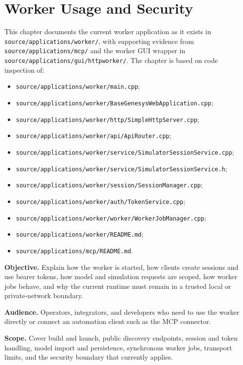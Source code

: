\chapter{Worker Usage and Security}
\label{chap:worker-usage-and-security}

This chapter documents the current worker application as it exists in
\texttt{source/applications/worker/}, with supporting evidence from
\texttt{source/applications/mcp/} and the worker GUI wrapper in
\texttt{source/applications/gui/httpworker/}. The chapter is based on code
inspection of:
\begin{itemize}
\item \texttt{source/applications/worker/main.cpp};
\item \texttt{source/applications/worker/BaseGenesysWebApplication.cpp};
\item \texttt{source/applications/worker/http/SimpleHttpServer.cpp};
\item \texttt{source/applications/worker/api/ApiRouter.cpp};
\item \texttt{source/applications/worker/service/SimulatorSessionService.cpp};
\item \texttt{source/applications/worker/service/SimulatorSessionService.h};
\item \texttt{source/applications/worker/session/SessionManager.cpp};
\item \texttt{source/applications/worker/auth/TokenService.cpp};
\item \texttt{source/applications/worker/worker/WorkerJobManager.cpp};
\item \texttt{source/applications/worker/README.md};
\item \texttt{source/applications/mcp/README.md}.
\end{itemize}

\noindent\textbf{Objective.} Explain how the worker is started, how clients
create sessions and use bearer tokens, how model and simulation requests are
scoped, how worker jobs behave, and why the current runtime must remain in a
trusted local or private-network boundary.

\noindent\textbf{Audience.} Operators, integrators, and developers who need to
use the worker directly or connect an automation client such as the MCP
connector.

\noindent\textbf{Scope.} Cover build and launch, public discovery endpoints,
session and token handling, model import and persistence, synchronous worker
jobs, transport limits, and the security boundary that currently applies.

